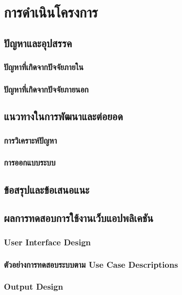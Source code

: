 \section{การดำเนินโครงการ}

\subsection{ปัญหาและอุปสรรค}

\subsubsection{ปัญหาที่เกิดจากปัจจัยภายใน}

\subsubsection{ปัญหาที่เกิดจากปัจจัยภายนอก}

\subsection{แนวทางในการพัฒนาและต่อยอด}

\subsubsection{การวิเคราะห์ปัญหา}

\subsubsection{การออกแบบระบบ}

\subsection{ข้อสรุปและข้อเสนอแนะ}

\subsection{ผลการทดสอบการใช้งานเว็บแอปพลิเคชัน}

\subsubsection{User Interface Design}

\subsubsection{ตัวอย่างการทดสอบระบบตาม Use Case Descriptions}

\subsubsection{Output Design}
